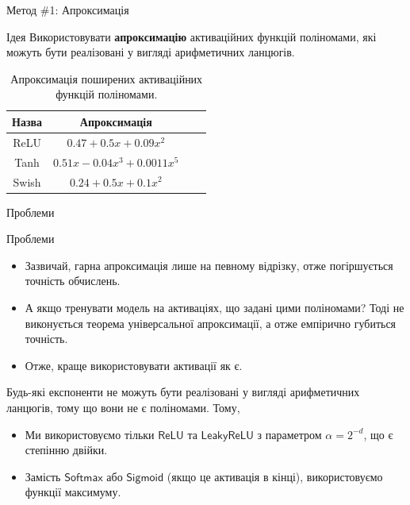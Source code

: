 \documentclass{zkdl-presentation-template}
\begin{document}
    \begin{frame}{Метод \#1: Апроксимація}
        \begin{block}{Ідея}
            Використовувати \textbf{апроксимацію} активаційних функцій
            поліномами, які можуть бути реалізовані у вигляді арифметичних
            ланцюгів.
        \end{block}

        \begin{table}[H]
            \centering
            \begin{tabular}{cccc}
                \hline
                \textbf{Назва} & \textbf{Апроксимація} \\
                \hline
                ReLU & $0.47 + 0.5x + 0.09x^2$ \\
                Tanh & $0.51x - 0.04x^3 + 0.0011x^5$ \\
                Swish & $0.24 + 0.5x + 0.1x^2$\\
                \hline
            \end{tabular}
            \caption{Апроксимація поширених активаційних функцій поліномами.}
            \label{table:activations-appr}
        \end{table}
    \end{frame}

    \begin{frame}{Проблеми}
        \begin{alertblock}{Проблеми}
            \begin{itemize}
                \item Зазвичай, гарна апроксимація лише на певному відрізку, отже 
                погіршується точність обчислень.
                \item А якщо тренувати модель на активаціях, що задані цими
                поліномами? Тоді не виконується теорема універсальної
                апроксимації, а отже емпірично губиться точність.
                \item Отже, краще використовувати активації як є.
            \end{itemize}
        \end{alertblock}

        Будь-які експоненти не можуть бути реалізовані у вигляді
        арифметичних ланцюгів, тому що вони не є поліномами. Тому,
        \begin{itemize}
            \item Ми використовуємо тільки $\mathsf{ReLU}$ та
            $\mathsf{LeakyReLU}$ з параметром $\alpha=2^{-d}$, що 
            є степінню двійки.
            \item Замість $\mathsf{Softmax}$ або $\mathsf{Sigmoid}$ (якщо це
            активація в кінці), використовуємо функції максимуму.
        \end{itemize}
    \end{frame}
\end{document}
